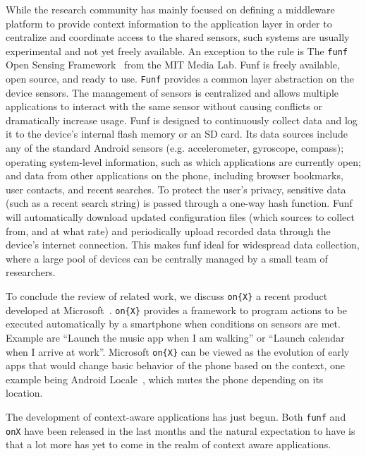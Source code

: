 \documentclass{acm_proc_article-sp}
\begin{document}
While the research community has mainly focused on defining a middleware platform to provide context information to the application layer in order to centralize and coordinate access to the shared sensors, such systems are usually experimental and not yet freely available.
An exception to the rule is The {\tt funf} Open Sensing Framework~\cite{funf}  from the MIT Media Lab. Funf is freely available, open source, and ready to use. {\tt Funf} provides a common layer abstraction on the device sensors. The management of sensors is centralized and allows multiple applications to interact with the same sensor without causing conflicts or dramatically increase usage. Funf is designed to continuously collect data and log it to the device's internal flash memory or an SD card. Its data sources include any of the standard Android sensors (e.g. accelerometer, gyroscope, compass); operating system-level information, such as which applications are currently open; and data from other applications on the phone, including browser bookmarks, user contacts, and recent searches. To protect the user's privacy, sensitive data (such as a recent search string) is passed through a one-way hash function. Funf will automatically download updated configuration files (which sources to collect from, and at what rate) and periodically upload recorded data through the device's internet connection. This makes funf ideal for widespread data collection, where a large pool of devices can be centrally managed by a small team of researchers.

To conclude the review of related work, we discuss {\tt on\{X\}} a recent product developed at Microsoft~\cite{onx}. {\tt on\{X\}} provides a framework to program actions to be executed automatically by a smartphone when conditions on sensors are met. Example are ``Launch the music app when I am walking'' or ``Launch calendar when I arrive at work''. 
Microsoft {\tt on\{X\}} can be viewed as the evolution of early apps that would change basic behavior of the phone based on the context, one example being Android Locale~\cite{android:locale}, which mutes the phone depending on its location. 

The development of context-aware applications has just begun. Both {\tt funf} and {\tt on{X}}  have been released in the last months and the natural expectation to have is that a lot more has yet to come in the realm of context aware applications.


\end{document}
